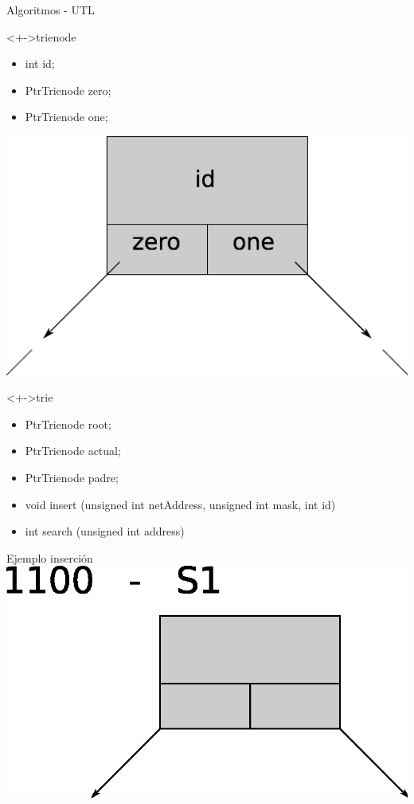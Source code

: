\documentclass[xcolor=dvipsnames]{beamer}
\begin{document}
\begin{frame}{Algoritmos - UTL}
\begin{block}<+->{trienode}   
    \begin{itemize}
      \scriptsize
     	\item int id;
     	\item PtrTrienode zero;
     	\item PtrTrienode one;
    \end{itemize}
	\center	
	\includegraphics[scale=0.15]{figures/utlimp.eps}  
  \end{block}

\begin{block}<+->{trie}   
    \begin{itemize}
      \scriptsize
     	\item PtrTrienode root;
	\item PtrTrienode actual;
	\item PtrTrienode padre;
	\item void insert (unsigned int netAddress, unsigned int mask, int id)
	\item int search (unsigned int address)
    \end{itemize}
  \end{block}
\end{frame}	


\begin{frame}{Ejemplo inserción} 
\center	
\includegraphics[scale=0.30]{figures/lluinsert01.eps} 
\end{frame}
\end{document}

